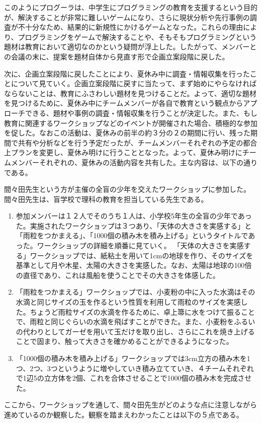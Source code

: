\documentclass[openany,11pt,papersize]{jsbook}
\begin{document}
\par このようにプログーラは、中学生にプログラミングの教育を支援するという目的が、解決することが非常に難しいゲームになり、さらに現状分析や先行事例の調査が不十分なため、結果的に新規性にかけるゲームとなった。これらの理由により、プログラミングをゲームで解決することや、そもそもプログラミングという題材は教育において適切なのかという疑問が浮上した。したがって、メンバーとの会議の末に、提案を題材自体から見直す形で企画立案段階に戻した。
\par 次に、企画立案段階に戻したことにより、夏休み中に調査・情報収集を行ったことについて見ていく。企画立案段階に戻すに当たって、まず始めにやらなければならないことは、教育にふさわしい題材を見つけることだ。よって、適切な題材を見つけるために、夏休み中にチームメンバーが各自で教育という観点からアプローチできる、題材や事例の調査・情報収集を行うことが決定した。また、もし教育に関連するワークショップなどのイベントが開催された場合、積極的な参加を促した。なおこの活動は、夏休みの前半の約３分の２の期間に行い、残った期間で共有や分析などを行う予定だったが、チームメンバーそれぞれの予定の都合上プランを変更し、夏休み明けに行うこととなった。よって、夏休み明けにチームメンバーそれぞれの、夏休みの活動内容を共有した。主な内容は、以下の通りである。


\par 間々田先生という方が主催の全盲の少年を交えたワークショップに参加した。間々田先生は、盲学校で理科の教育を担当している先生である。

\begin{enumerate}
\item 参加メンバーは１２人でそのうち１人は、小学校5年生の全盲の少年であった。実施されたワークショップは３つあり、「天体の大きさを実感する」と「雨粒をつかまえる」、「1000個の積み木を積み上げる」というタイトルであった。ワークショップの詳細を順番に見ていく。
「天体の大きさを実感する」ワークショップでは、紙粘土を用いて1cmの地球を作り、そのサイズを基準として月や木星、太陽の大きさを実感した。なお、太陽は地球の100倍の直径であり、これは風船を使うことでその大きさを体感した。
\item「雨粒をつかまえる」ワークショップでは、小麦粉の中に入った水滴はその水滴と同じサイズの玉を作るという性質を利用して雨粒のサイズを実感した。ちょうど雨粒サイズの水滴を作るために、卓上箒に水をつけて振ることで、雨粒と同じぐらいの水滴を飛ばすことができた。また、小麦粉をふるいの代わりとしてガーゼを用いて玉だけを取り出し、さらにこれを焼き上げることで固まり、触って大きさを確かめることができるようになった。
\item「1000個の積み木を積み上げる」ワークショップでは3cm立方の積み木を1つ、2つ、3つというように増やしていき積み立てていき、４チームそれぞれで1辺5の立方体を2個、これを合体させることで1000個の積み木を完成させた。
\end{enumerate}
\par ここから、ワークショップを通して、間々田先生がどのような点に注意しながら進めているのか観察した。観察を踏まえわかったことは以下の５点である。
\end{document}
